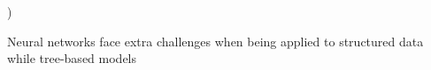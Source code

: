 
\iffalse
{})


Neural networks face extra challenges when being applied to structured data while tree-based models

